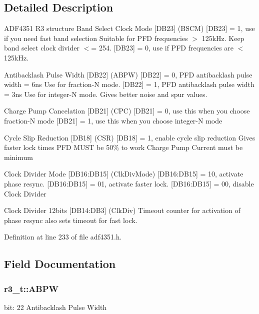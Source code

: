 \subsection{Detailed Description}
A\+D\+F4351 R3 structure Band Select Clock Mode \mbox{[}D\+B23\mbox{]} (B\+S\+CM) \mbox{[}D\+B23\mbox{]} = 1, use if you need fast band selection Suitable for P\+FD frequencies $>$ 125k\+Hz. Keep band select clock divider $<$= 254. \mbox{[}D\+B23\mbox{]} = 0, use if P\+FD frequencies are $<$ 125k\+Hz. 

Antibacklash Pulse Width \mbox{[}D\+B22\mbox{]} (A\+B\+PW) \mbox{[}D\+B22\mbox{]} = 0, P\+FD antibacklash pulse width = 6ns Use for fraction-\/N mode. \mbox{[}D\+B22\mbox{]} = 1, P\+FD antibacklash pulse width = 3ns Use for integer-\/N mode. Gives better noise and spur values.

Charge Pump Cancelation \mbox{[}D\+B21\mbox{]} (C\+PC) \mbox{[}D\+B21\mbox{]} = 0, use this when you choose fraction-\/N mode \mbox{[}D\+B21\mbox{]} = 1, use this when you choose integer-\/N mode

Cycle Slip Reduction \mbox{[}D\+B18\mbox{]} (C\+SR) \mbox{[}D\+B18\mbox{]} = 1, enable cycle slip reduction Gives faster lock times P\+FD M\+U\+ST be 50\% to work Charge Pump Current must be minimum

Clock Divider Mode \mbox{[}D\+B16\+:D\+B15\mbox{]} (Clk\+Div\+Mode) \mbox{[}D\+B16\+:D\+B15\mbox{]} = 10, activate phase resync. \mbox{[}D\+B16\+:D\+B15\mbox{]} = 01, activate faster lock. \mbox{[}D\+B16\+:D\+B15\mbox{]} = 00, disable Clock Divider

Clock Divider 12bits \mbox{[}D\+B14\+:D\+B3\mbox{]} (Clk\+Div) Timeout counter for activation of phase resync also sets timeout for fast lock. 

Definition at line 233 of file adf4351.\+h.



\subsection{Field Documentation}
\subsubsection[{\texorpdfstring{A\+B\+PW}{ABPW}}]{ r3\+\_\+t\+::\+A\+B\+PW}\hypertarget{structr3__t_a5f81f8e2e2dedd4c4b7d939e51ae2c4c}{}\label{structr3__t_a5f81f8e2e2dedd4c4b7d939e51ae2c4c}
bit\+: 22 Antibacklash Pulse Width 

